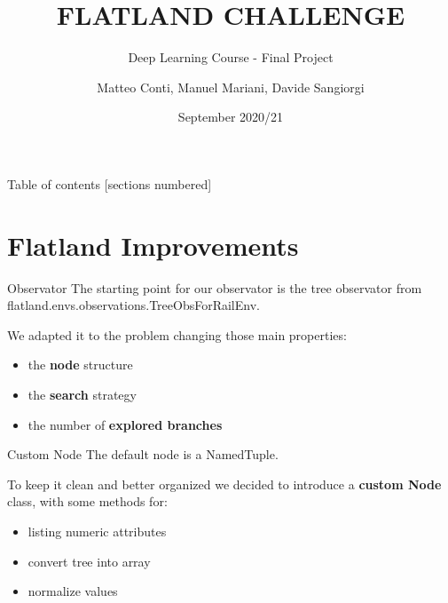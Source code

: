 \documentclass[10pt, xcolor={dvipsnames}]{beamer}
\title{FLATLAND CHALLENGE}
\subtitle{Deep Learning Course - Final Project}
\author{Matteo Conti, Manuel Mariani, Davide Sangiorgi}
\date{September 2020/21}
\institute{M.Sc. Artificial Intelligence, University of Bologna}
\begin{document}
\maketitle

\begin{frame}{Table of contents}
  [sections numbered]
  \tableofcontents%
\end{frame}




\section{Flatland Improvements}
\begin{frame}{Observator}
    The starting point for our observator is the tree observator from flatland.envs.observations.TreeObsForRailEnv.
    
    We adapted it to the problem changing those main properties:
    \begin{itemize}
        \item the \textbf{node} structure
        \item the \textbf{search} strategy
        \item the number of \textbf{explored branches}
    \end{itemize}
\end{frame}
\begin{frame}{Custom Node}
    The default node is a NamedTuple.
    
    To keep it clean and better organized we decided to introduce a \textbf{custom Node} class, with some methods for:
    \begin{itemize}
        \item listing numeric attributes
        \item convert tree into array
        \item normalize values
    \end{itemize}
\end{frame}
\end{document}
